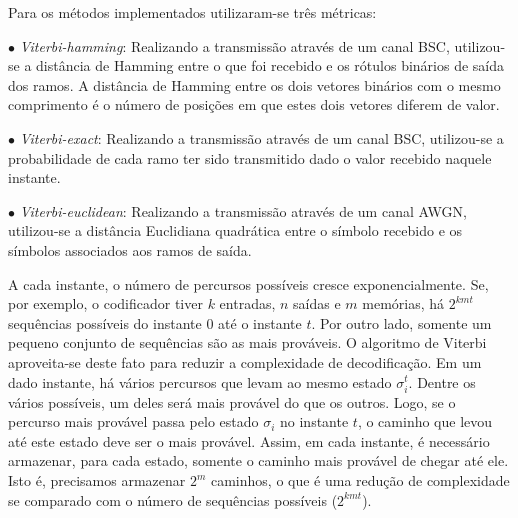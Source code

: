 Para os métodos implementados utilizaram-se três métricas:

$\bullet$ \textit{Viterbi-hamming}: Realizando a transmissão através de um canal BSC, utilizou-se a distância de Hamming entre o que foi recebido e os rótulos binários de saída dos ramos. A distância de Hamming entre os dois vetores binários com o mesmo comprimento é o número de posições em que estes dois vetores diferem de valor.

$\bullet$ \textit{Viterbi-exact}: Realizando a transmissão através de um canal BSC, utilizou-se a probabilidade de cada ramo ter sido transmitido dado o valor recebido naquele instante.

$\bullet$ \textit{Viterbi-euclidean}: Realizando a transmissão através de um canal AWGN, utilizou-se a distância Euclidiana quadrática entre o símbolo recebido e os símbolos associados aos ramos de saída.

A cada instante, o número de percursos possíveis cresce exponencialmente. Se, por exemplo, o codificador tiver $k$ entradas, $n$ saídas e $m$ memórias, há $2^{kmt}$ sequências possíveis do instante $0$ até o instante $t$. Por outro lado, somente um pequeno conjunto de sequências são as mais prováveis. O algoritmo de Viterbi aproveita-se deste fato para reduzir a complexidade de decodificação. Em um dado instante, há vários percursos que levam ao mesmo estado $\sigma_{i}^{t}$. Dentre os vários possíveis, um deles será mais provável do que os outros. Logo, se o percurso mais provável passa pelo estado $\sigma_{i}$ no instante $t$, o caminho que levou até este estado deve ser o mais provável. Assim, em cada instante, é necessário armazenar, para cada estado, somente o caminho mais provável de chegar até ele. Isto é, precisamos armazenar $2^m$ caminhos, o que é uma redução de complexidade se comparado com o número de sequências possíveis ($2^{kmt}$).

